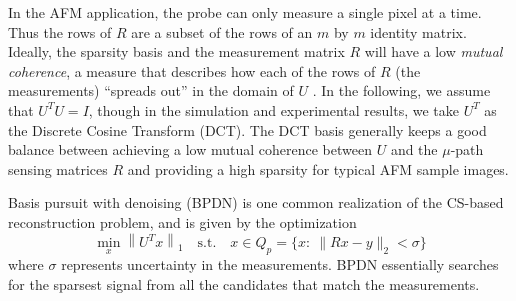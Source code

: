 \documentclass[twocolumn,oneside]{IEEEtran/IEEEtran}
\begin{document}
	
In the AFM application, the probe can only measure a single pixel at a time.
Thus the rows of $R$ are a subset of the rows of an $m$ by $m$ identity matrix.
Ideally, the sparsity basis and
the measurement matrix $R$ will have a low \textit{mutual coherence}, a
measure that describes how each of the rows of $R$ (the measurements)
``spreads out'' in the domain of $U$ \cite{candes2007sparsity}.
In the following, we assume that $U^TU=I$, though in the simulation and
experimental results, we take $U^T$ as the Discrete Cosine Transform (DCT).
The DCT basis generally keeps a good balance between achieving a low
mutual coherence between $U$ and the $\mu$-path sensing
matrices $R$ and providing a high sparsity for typical AFM sample images. 
	
Basis pursuit with denoising (BPDN) is one common realization of the CS-based
reconstruction problem, and is given by the optimization
\begin{equation}
  \min_{x} \left \| U^Tx \right \|_1 \quad
  \text{s.t.}\quad x\in Q_p = \{x:~\|Rx - y\|_2 < \sigma\} \label{op:bp}
\end{equation}
where $\sigma$ represents uncertainty in the measurements. BPDN
essentially searches for the sparsest signal from all
the candidates that match the measurements.
\end{document}
